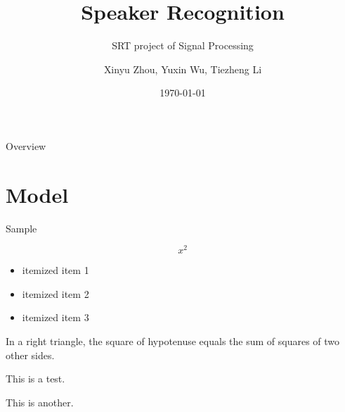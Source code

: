 \documentclass {beamer}
\title{Speaker Recognition}
\subtitle{SRT project of Signal Processing}
\author {Xinyu Zhou, Yuxin Wu, Tiezheng Li}
\institute{
  Department of Computer Science and Technology\\
  Tsinghua University\\
}
\date{\today}
\theoremstyle{plain}
\begin{document}
\frame[plain]{\titlepage}

\begin{frame}{Overview}
\tableofcontents
\end{frame}



\section{Model}






\begin{frame}{Sample}

  \[ x ^ 2\]

  \begin{itemize}
    \item itemized item 1
    \item itemized item 2
    \item itemized item 3
  \end{itemize}

  \begin{theorem}
    In a right triangle, the square of hypotenuse equals
    the sum of squares of two other sides.
  \end{theorem}

  This is a test.
  \medskip

  \pause
  This is another.


\end{frame}
\end{document}

